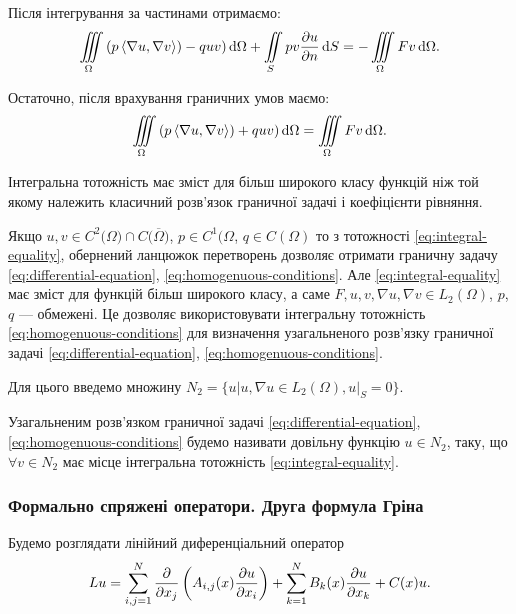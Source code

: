 Після інтегрування за частинами отримаємо:
\begin{equation}
    \Iiint_\Omega \left( p \langle \nabla u, \nabla v \rangle) - q u v \right) \diff \Omega + \Iint_S p v \frac{\partial u}{\partial n} \diff S = - \Iiint_\Omega F v \diff \Omega.
\end{equation}

Остаточно, після врахування граничних умов маємо:
\begin{equation}
    \label{eq:integral-equality}
    \Iiint_\Omega \left( p \langle \nabla u, \nabla v \rangle) + q u v \right) \diff \Omega = \Iiint_\Omega F v \diff \Omega.
\end{equation}

Інтегральна тотожність має зміст для більш широкого класу функцій ніж той якому належить класичний розв'язок граничної задачі і коефіцієнти рівняння. \medskip

Якщо $u, v \in C^2 \big( \Omega \big) \cap C \big( \overline \Omega \big)$, $p \in C^1 (\Omega$, $q \in C (\Omega)$ то з тотожності \eqref{eq:integral-equality}, обернений ланцюжок перетворень дозволяє отримати граничну задачу \eqref{eq:differential-equation}, \eqref{eq:homogenuous-conditions}. Але \eqref{eq:integral-equality} має зміст для функцій більш широкого класу, а саме $F, u, v, \nabla u, \nabla v \in L_2(\Omega)$, $p$, $q$ --- обмежені. Це дозволяє використовувати інтегральну тотожність \eqref{eq:homogenuous-conditions} для визначення узагальненого розв'язку граничної
задачі \eqref{eq:differential-equation}, \eqref{eq:homogenuous-conditions}. \medskip

Для цього введемо множину $N_2 = \{u | u, \nabla u \in L_2(\Omega), \left.u \right|_S = 0\}$.

\begin{definition}
    Узагальненим розв'язком граничної задачі \eqref{eq:differential-equation}, \eqref{eq:homogenuous-conditions} будемо називати довільну функцію $u \in N_2$, таку, що $\forall v \in N_2$ має місце інтегральна тотожність \eqref{eq:integral-equality}.    
\end{definition}

\subsubsection{Формально спряжені оператори. Друга формула Гріна}

Будемо розглядати лінійний диференціальний оператор
\begin{equation}
    L u = \displaystyle\sum\limits_{i, j = 1}^N \frac{\partial}{\partial x_j} \left( A_{i,j}(x) \frac{\partial u}{\partial x_i} \right) + \displaystyle\sum\limits_{k = 1}^N B_k(x) \frac{\partial u}{\partial x_k} + C(x) u.
\end{equation}

